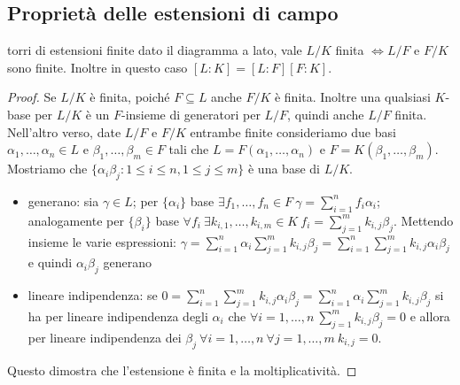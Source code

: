 \subsection{Proprietà delle estensioni di campo}
\begin{minipage}{0.9\textwidth}
\begin{theorem}{torri di estensioni finite}
    dato il diagramma a lato, vale $L/K$ finita $\iff L/F$ e $F/K$ sono finite. Inoltre in questo caso $[L:K] = [L:F][F:K]$.
\end{theorem}
\end{minipage}\hfill
\begin{minipage}{0.1\textwidth}  
\end{minipage}\hfill
\begin{proof}
    Se $L/K$ è finita, poiché $F \subseteq L$ anche $F/K$ è finita. Inoltre una qualsiasi $K$-base per $L/K$ è un $F$-insieme di generatori per $L/F$, quindi anche $L/F$ finita. Nell'altro verso, date $L/F$ e $F/K$ entrambe finite consideriamo due basi $\alpha_1,\dots, \alpha_n \in L$ e $\beta_1, \dots, \beta_m \in F$ tali che $L = F(\alpha_1,\dots, \alpha_n)$ e $F = K(\beta_1, \dots, \beta_m)$. Mostriamo che $\{\alpha_i \beta_j : 1 \le i \le n, 1 \le j \le m \}$ è una base di $L/K$.
    \begin{itemize}
        \item generano: sia $\gamma \in L$; per $\{\alpha_i\}$ base $\exists f_1,\dots,f_n \in F \ \gamma = \sum_{i=1}^n f_i \alpha_i$; analogamente per $\{\beta_i\}$ base $\forall f_i \ \exists k_{i,1},\dots,k_{i,m} \in K \ f_i =\sum_{j=1}^m k_{i,j} \beta_j$. Mettendo insieme le varie espressioni: $\gamma = \sum_{i=1}^n \alpha_i\sum_{j=1}^m k_{i,j} \beta_j = \sum_{i=1}^n\sum_{j=1}^m k_{i,j}\alpha_i\beta_j$ e quindi $\alpha_i\beta_j$ generano
        \item lineare indipendenza: se $0 = \sum_{i=1}^n\sum_{j=1}^m k_{i,j}\alpha_i\beta_j = \sum_{i=1}^n \alpha_i\sum_{j=1}^m k_{i,j} \beta_j$ si ha per lineare indipendenza degli $\alpha_i$ che $\forall i = 1,\dots, n \ \sum_{j=1}^m k_{i,j} \beta_j = 0$ e allora per lineare indipendenza dei $\beta_j \ \forall i=1,\dots,n \ \forall j = 1,\dots, m \ k_{i,j} = 0$.
    \end{itemize}
    Questo dimostra che l'estensione è finita e la moltiplicatività.
\end{proof}
